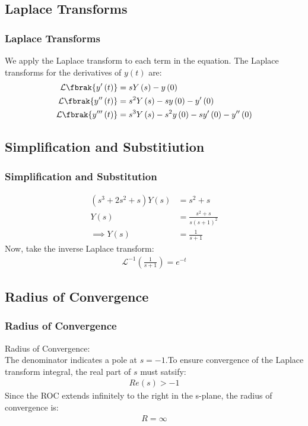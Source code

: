 \documentclass{beamer}
\providecommand{\brak}[1]{\ensuremath{\left(#1\right)}}
\theoremstyle{remark}
\numberwithin{equation}{section}
\begin{document}
\subsection{Laplace Transforms}
\begin{frame}
\frametitle{Laplace Transforms}
We apply the Laplace transform to each term in the equation. The Laplace transforms for the derivatives of $y\brak{t}$ are:
\begin{align}
\mathcal{L}\fbrak{y^{\prime}\brak{t}} &= sY\brak{s} - y\brak{0} \\
\mathcal{L}\fbrak{y^{\prime\prime}\brak{t}} &= s^2Y\brak{s} - sy\brak{0} - y^{\prime}\brak{0} \\
\mathcal{L}\fbrak{y^{\prime\prime\prime}\brak{t}} &= s^3Y\brak{s} - s^2 y\brak{0} - sy^{\prime}\brak{0} - y^{\prime\prime}\brak{0}
\end{align}
\end{frame}
\subsection{Simplification and Substitiution}
\begin{frame}
\frametitle{Simplification and Substitution}
\begin{align}
\brak{s^3 + 2s^2 + s} Y\brak{s} &= s^2 + s \\
Y\brak{s} &= \frac{s^2 + s}{s(s+1)^2}\\
\implies Y\brak{s} &= \frac{1}{s + 1}
\end{align}
Now, take the inverse Laplace transform:
\begin{align}
\mathcal{L}^{-1}\brak{\frac{1}{s + 1}} = e^{-t}
\end{align}
\end{frame}
\subsection{Radius of Convergence}
\begin{frame}
    \frametitle{Radius of Convergence}
    Radius of Convergence:\\
The denominator indicates a pole at $s=-1$.To ensure convergence of the Laplace transform integral, the real part of $s$ must satsify:
\begin{align}
    Re\brak{s}>-1
\end{align}
Since the ROC extends infinitely to the right in the s-plane, the radius of convergence is:
\begin{align}
    R=\infty
\end{align}
\end{frame}
\end{document}
